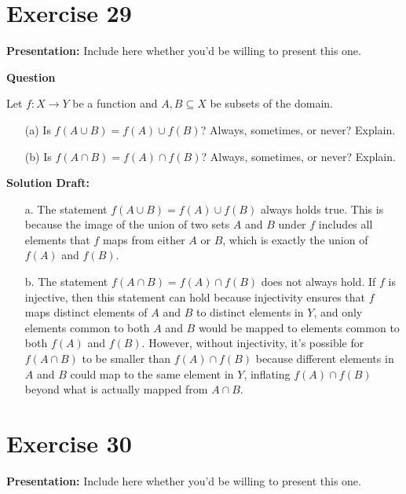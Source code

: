 \documentclass{article}
\begin{document}
\section*{Exercise 29}  

\noindent\textbf{Presentation:} Include here whether you'd be willing to present this one. 

\vspace{0.5cm} %

\noindent\textbf{Question}

Let \( f : X \to Y \) be a function and \( A, B \subseteq X \) be subsets of the domain.
\begin{enumerate}
    \item[(a)] Is \( f(A \cup B) = f(A) \cup f(B) \)? Always, sometimes, or never? Explain.
    \item[(b)] Is \( f(A \cap B) = f(A) \cap f(B) \)? Always, sometimes, or never? Explain.
\end{enumerate}

\noindent\textbf{Solution Draft:} 

\begin{enumerate}
\item[a.]
The statement \( f(A \cup B) = f(A) \cup f(B) \) always holds true. This is because the image of the union of two sets \( A \) and \( B \) under \( f \) includes all elements that \( f \) maps from either \( A \) or \( B \), which is exactly the union of \( f(A) \) and \( f(B) \).

\item[b.]
The statement \( f(A \cap B) = f(A) \cap f(B) \) does not always hold. If \( f \) is injective, then this statement can hold because injectivity ensures that \( f \) maps distinct elements of \( A \) and \( B \) to distinct elements in \( Y \), and only elements common to both \( A \) and \( B \) would be mapped to elements common to both \( f(A) \) and \( f(B) \). However, without injectivity, it's possible for \( f(A \cap B) \) to be smaller than \( f(A) \cap f(B) \) because different elements in \( A \) and \( B \) could map to the same element in \( Y \), inflating \( f(A) \cap f(B) \) beyond what is actually mapped from \( A \cap B \).
\end{enumerate}

\section*{Exercise 30}  

\noindent\textbf{Presentation:} Include here whether you'd be willing to present this one. 
\end{document}
